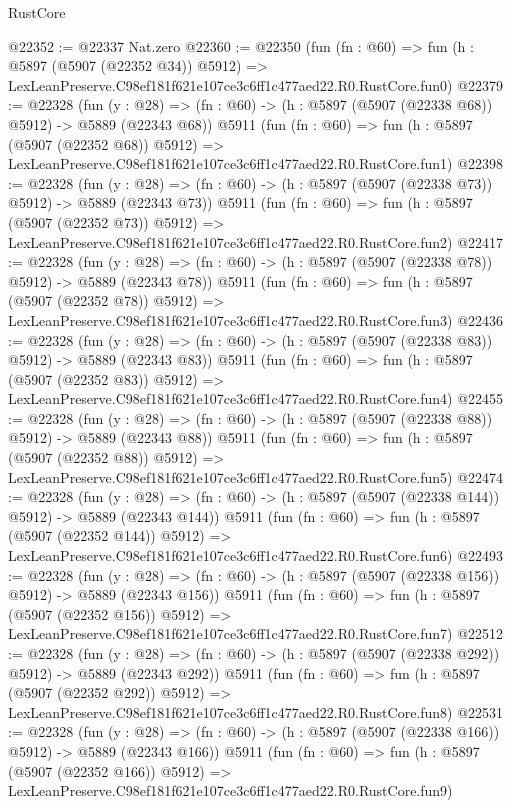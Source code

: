 \begin{lexlean}{RustCore}
\begin{coremodule}
@22352 := @22337 Nat.zero
@22360 := @22350
    (fun (fn : @60) =>
    fun (h : @5897 (@5907 (@22352 @34)) @5912) =>
    LexLeanPreserve.C98ef181f621e107ce3c6ff1c477aed22.R0.RustCore.fun0)
@22379 := @22328
    (fun (y : @28) => (fn : @60) -> (h : @5897 (@5907 (@22338 @68)) @5912) -> @5889 (@22343 @68))
    @5911
    (fun (fn : @60) =>
    fun (h : @5897 (@5907 (@22352 @68)) @5912) =>
    LexLeanPreserve.C98ef181f621e107ce3c6ff1c477aed22.R0.RustCore.fun1)
@22398 := @22328
    (fun (y : @28) => (fn : @60) -> (h : @5897 (@5907 (@22338 @73)) @5912) -> @5889 (@22343 @73))
    @5911
    (fun (fn : @60) =>
    fun (h : @5897 (@5907 (@22352 @73)) @5912) =>
    LexLeanPreserve.C98ef181f621e107ce3c6ff1c477aed22.R0.RustCore.fun2)
@22417 := @22328
    (fun (y : @28) => (fn : @60) -> (h : @5897 (@5907 (@22338 @78)) @5912) -> @5889 (@22343 @78))
    @5911
    (fun (fn : @60) =>
    fun (h : @5897 (@5907 (@22352 @78)) @5912) =>
    LexLeanPreserve.C98ef181f621e107ce3c6ff1c477aed22.R0.RustCore.fun3)
@22436 := @22328
    (fun (y : @28) => (fn : @60) -> (h : @5897 (@5907 (@22338 @83)) @5912) -> @5889 (@22343 @83))
    @5911
    (fun (fn : @60) =>
    fun (h : @5897 (@5907 (@22352 @83)) @5912) =>
    LexLeanPreserve.C98ef181f621e107ce3c6ff1c477aed22.R0.RustCore.fun4)
@22455 := @22328
    (fun (y : @28) => (fn : @60) -> (h : @5897 (@5907 (@22338 @88)) @5912) -> @5889 (@22343 @88))
    @5911
    (fun (fn : @60) =>
    fun (h : @5897 (@5907 (@22352 @88)) @5912) =>
    LexLeanPreserve.C98ef181f621e107ce3c6ff1c477aed22.R0.RustCore.fun5)
@22474 := @22328
    (fun (y : @28) => (fn : @60) -> (h : @5897 (@5907 (@22338 @144)) @5912) -> @5889 (@22343 @144))
    @5911
    (fun (fn : @60) =>
    fun (h : @5897 (@5907 (@22352 @144)) @5912) =>
    LexLeanPreserve.C98ef181f621e107ce3c6ff1c477aed22.R0.RustCore.fun6)
@22493 := @22328
    (fun (y : @28) => (fn : @60) -> (h : @5897 (@5907 (@22338 @156)) @5912) -> @5889 (@22343 @156))
    @5911
    (fun (fn : @60) =>
    fun (h : @5897 (@5907 (@22352 @156)) @5912) =>
    LexLeanPreserve.C98ef181f621e107ce3c6ff1c477aed22.R0.RustCore.fun7)
@22512 := @22328
    (fun (y : @28) => (fn : @60) -> (h : @5897 (@5907 (@22338 @292)) @5912) -> @5889 (@22343 @292))
    @5911
    (fun (fn : @60) =>
    fun (h : @5897 (@5907 (@22352 @292)) @5912) =>
    LexLeanPreserve.C98ef181f621e107ce3c6ff1c477aed22.R0.RustCore.fun8)
@22531 := @22328
    (fun (y : @28) => (fn : @60) -> (h : @5897 (@5907 (@22338 @166)) @5912) -> @5889 (@22343 @166))
    @5911
    (fun (fn : @60) =>
    fun (h : @5897 (@5907 (@22352 @166)) @5912) =>
    LexLeanPreserve.C98ef181f621e107ce3c6ff1c477aed22.R0.RustCore.fun9)

\end{coremodule}
\end{lexlean}
